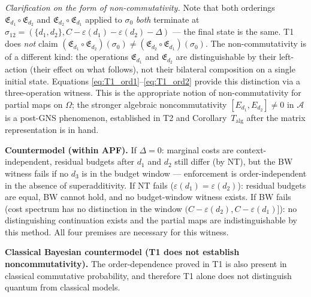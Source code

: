\documentclass[11pt]{article}
\theoremstyle{remark}
\begin{document}
\begin{tcolorbox}[apfbox, title={Theorem T1 --- The Bridge Theorem (Order-Dependence)}]
\smallskip\noindent\textit{Clarification on the form of non-commutativity.}  Note that both orderings $\mathfrak{E}_{d_1} \circ \mathfrak{E}_{d_2}$ and $\mathfrak{E}_{d_2} \circ \mathfrak{E}_{d_1}$ applied to $\sigma_0$ \emph{both} terminate at $\sigma_{12} = (\{d_1,d_2\}, C - \varepsilon(d_1) - \varepsilon(d_2) - \Delta)$ — the final state is the same.  T1 does \emph{not} claim $(\mathfrak{E}_{d_1} \circ \mathfrak{E}_{d_2})(\sigma_0) \ne (\mathfrak{E}_{d_2} \circ \mathfrak{E}_{d_1})(\sigma_0)$.  The non-commutativity is of a different kind: the operations $\mathfrak{E}_{d_1}$ and $\mathfrak{E}_{d_2}$ are distinguishable by their left-action (their effect on what follows), not their bilateral composition on a single initial state.  Equations \eqref{eq:T1_ord1}--\eqref{eq:T1_ord2} provide this distinction via a three-operation witness.  This is the appropriate notion of non-commutativity for partial maps on $\Omega$; the stronger algebraic noncommutativity $[E_{d_1},E_{d_2}]\ne 0$ in $\mathcal{A}$ is a post-GNS phenomenon, established in T2 and Corollary~$T_{\mathrm{alg}}$ after the matrix representation is in hand.

\smallskip\noindent\textbf{Countermodel (within APF).}  If $\Delta = 0$: marginal costs are context-independent, residual budgets after $d_1$ and $d_2$ still differ (by NT), but the BW witness fails if no $d_3$ is in the budget window --- enforcement is order-independent in the absence of superadditivity.  If NT fails ($\varepsilon(d_1) = \varepsilon(d_2)$): residual budgets are equal, BW cannot hold, and no budget-window witness exists.  If BW fails (cost spectrum has no distinction in the window $(C-\varepsilon(d_2), C-\varepsilon(d_1)]$): no distinguishing continuation exists and the partial maps are indistinguishable by this method.  All four premises are necessary for this witness.

\smallskip\noindent\textbf{Classical Bayesian countermodel (T1 does not establish noncommutativity).}  The order-dependence proved in T1 is also present in classical commutative probability, and therefore T1 alone does not distinguish quantum from classical models.


\end{tcolorbox}
\end{document}
